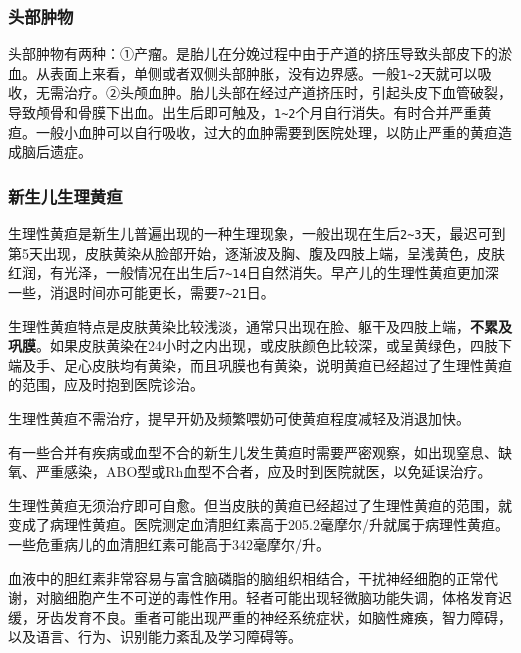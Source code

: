 
\subsubsection{头部肿物}

头部肿物有两种：①产瘤。是胎儿在分娩过程中由于产道的挤压导致头部皮下的淤血。从表面上来看，单侧或者双侧头部肿胀，没有边界感。一般\texttt{1\textasciitilde{}2}\hspace{0pt}天就可以吸收，无需治疗。②头颅血肿。胎儿头部在经过产道挤压时，引起头皮下血管破裂，导致颅骨和骨膜下出血。出生后即可触及，\texttt{1\textasciitilde{}2}\hspace{0pt}个月自行消失。有时合并严重黄疸。一般小血肿可以自行吸收，过大的血肿需要到医院处理，以防止严重的黄疸造成脑后遗症。

\subsubsection{新生儿生理黄疸}%

生理性黄疸是新生儿普遍出现的一种生理现象，一般出现在生后\texttt{2\textasciitilde{}3}\hspace{0pt}天，最迟可到第5天出现，皮肤黄染从脸部开始，逐渐波及胸、腹及四肢上端，呈浅黄色，皮肤红润，有光泽，一般情况在出生后\texttt{7\textasciitilde{}14}\hspace{0pt}日自然消失。早产儿的生理性黄疸更加深一些，消退时间亦可能更长，需要\texttt{7\textasciitilde{}21}\hspace{0pt}日。

生理性黄疸特点是皮肤黄染比较浅淡，通常只出现在脸、躯干及四肢上端，\textbf{不累及巩膜}。如果皮肤黄染在24小时之内出现，或皮肤颜色比较深，或呈黄绿色，四肢下端及手、足心皮肤均有黄染，而且巩膜也有黄染，说明黄疸已经超过了生理性黄疸的范围，应及时抱到医院诊治。

生理性黄疸不需治疗，提早开奶及频繁喂奶可使黄疸程度减轻及消退加快。

有一些合并有疾病或血型不合的新生儿发生黄疸时需要严密观察，如出现窒息、缺氧、严重感染，ABO型或Rh血型不合者，应及时到医院就医，以免延误治疗。

生理性黄疸无须治疗即可自愈。但当皮肤的黄疸已经超过了生理性黄疸的范围，就变成了病理性黄疸。医院测定血清胆红素高于205.2毫摩尔/升就属于病理性黄疸。一些危重病儿的血清胆红素可能高于342毫摩尔/升。

血液中的胆红素非常容易与富含脑磷脂的脑组织相结合，干扰神经细胞的正常代谢，对脑细胞产生不可逆的毒性作用。轻者可能出现轻微脑功能失调，体格发育迟缓，牙齿发育不良。重者可能出现严重的神经系统症状，如脑性瘫痪，智力障碍，以及语言、行为、识别能力紊乱及学习障碍等。

